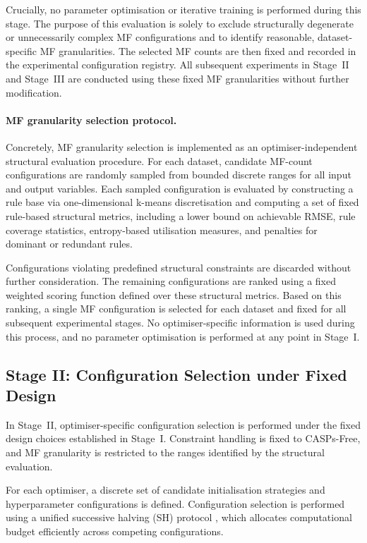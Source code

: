 \documentclass[conference]{IEEEtran}
\begin{document}
Crucially, no parameter optimisation or iterative training is performed during
this stage.
The purpose of this evaluation is solely to exclude structurally degenerate or
unnecessarily complex MF configurations and to identify reasonable,
dataset-specific MF granularities.
The selected MF counts are then fixed and recorded in the experimental
configuration registry.
All subsequent experiments in Stage~II and Stage~III are conducted using these
fixed MF granularities without further modification.
\paragraph*{MF granularity selection protocol.}
Concretely, MF granularity selection is implemented as an optimiser-independent
structural evaluation procedure.
For each dataset, candidate MF-count configurations are randomly sampled from
bounded discrete ranges for all input and output variables.
Each sampled configuration is evaluated by constructing a rule base via
one-dimensional k-means discretisation and computing a set of fixed
rule-based structural metrics, including a lower bound on achievable RMSE,
rule coverage statistics, entropy-based utilisation measures, and penalties
for dominant or redundant rules.

Configurations violating predefined structural constraints are discarded
without further consideration.
The remaining configurations are ranked using a fixed weighted scoring
function defined over these structural metrics.
Based on this ranking, a single MF configuration is selected for each dataset
and fixed for all subsequent experimental stages.
No optimiser-specific information is used during this process, and no parameter
optimisation is performed at any point in Stage~I.


\subsection{Stage II: Configuration Selection under Fixed Design}

In Stage~II, optimiser-specific configuration selection is performed under the
fixed design choices established in Stage~I.
Constraint handling is fixed to CASPs-Free, and MF granularity is restricted to
the ranges identified by the structural evaluation.

For each optimiser, a discrete set of candidate initialisation strategies and
hyperparameter configurations is defined.
Configuration selection is performed using a unified successive halving (SH)
protocol \cite{jamieson2016sh}, which allocates computational budget efficiently
across competing configurations.
\end{document}
